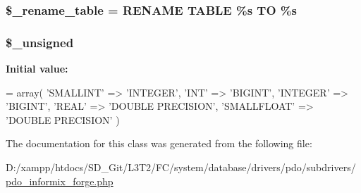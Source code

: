 \subsubsection[{\$\+\_\+rename\+\_\+table}]{\setlength{\rightskip}{0pt plus 5cm}\$\+\_\+rename\+\_\+table = \textquotesingle{}R\+E\+N\+A\+M\+E T\+A\+B\+L\+E \%s T\+O \%s\textquotesingle{}\hspace{0.3cm}{\ttfamily [protected]}}\label{class_c_i___d_b__pdo__informix__forge_a1a649e7cf9de16bcf932977b18bc91de}
\hypertarget{class_c_i___d_b__pdo__informix__forge_aae977ae6d61fa183f0b25422b6ddc31c}{}
\subsubsection[{\$\+\_\+unsigned}]{\setlength{\rightskip}{0pt plus 5cm}\$\+\_\+unsigned\hspace{0.3cm}{\ttfamily [protected]}}\label{class_c_i___d_b__pdo__informix__forge_aae977ae6d61fa183f0b25422b6ddc31c}
{\bfseries Initial value\+:}
\begin{DoxyCode}
= array(
        \textcolor{stringliteral}{'SMALLINT'}  => \textcolor{stringliteral}{'INTEGER'},
        \textcolor{stringliteral}{'INT'}       => \textcolor{stringliteral}{'BIGINT'},
        \textcolor{stringliteral}{'INTEGER'}   => \textcolor{stringliteral}{'BIGINT'},
        \textcolor{stringliteral}{'REAL'}      => \textcolor{stringliteral}{'DOUBLE PRECISION'},
        \textcolor{stringliteral}{'SMALLFLOAT'}    => \textcolor{stringliteral}{'DOUBLE PRECISION'}
    )
\end{DoxyCode}


The documentation for this class was generated from the following file\+:\begin{DoxyCompactItemize}
\item 
D\+:/xampp/htdocs/\+S\+D\+\_\+\+Git/\+L3\+T2/\+F\+C/system/database/drivers/pdo/subdrivers/\hyperlink{pdo__informix__forge_8php}{pdo\+\_\+informix\+\_\+forge.\+php}\end{DoxyCompactItemize}
